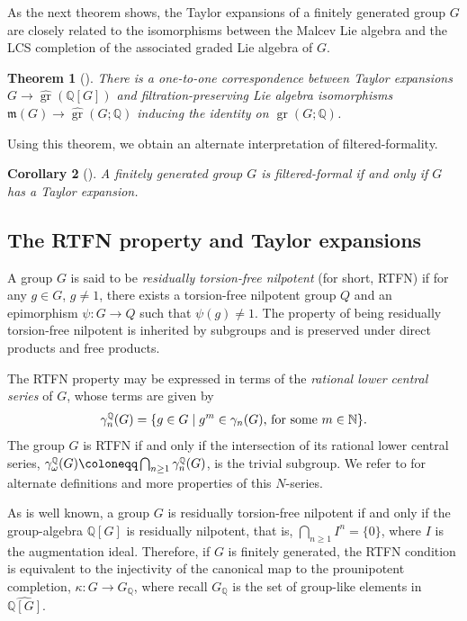 \documentclass{article}
\numberwithin{equation}{section}
\newtheorem{theorem}{Theorem}[section]
\newtheorem{corollary}[theorem]{Corollary}
\theoremstyle{definition}
\newcommand{\N}{\mathbb{N}}
\newcommand{\Q}{\mathbb{Q}}
\newcommand{\m}{{\mathfrak{m}}}
\DeclareMathOperator{\gr}{gr}
\DeclareMathOperator{\rat}{\scalebox{0.6}{$\Q$}}
\begin{document}
As the next theorem shows, the Taylor expansions of a finitely generated 
group $G$ are closely related to the isomorphisms between the Malcev Lie 
algebra and the LCS completion of the associated 
graded Lie algebra of $G$.

\begin{theorem}[\cite{SW-ejm}]
\label{thm:expansionFiltered}
There is a one-to-one correspondence between Taylor expansions 
$G\to \widehat{\gr}(\Q[G])$ and filtration-preserving Lie algebra isomorphisms 
$\m(G)\to \widehat{\gr}(G;\Q)$ inducing the identity on $\gr(G;\Q)$.  
\end{theorem}

Using this theorem, we obtain an alternate interpretation of filtered-formality.

\begin{corollary}[\cite{SW-ejm}]
\label{cor:TFF}
A finitely generated group $G$ is filtered-formal if and only if $G$ 
has a Taylor expansion.
\end{corollary}

\subsection{The RTFN property and Taylor expansions}
\label{subsec:rtfn-taylor}

A group $G$ is said to be {\em residually torsion-free nilpotent}\/ 
(for short, RTFN) if for any $g\in G$, $g\neq 1$,
there exists a torsion-free nilpotent group $Q$ 
and an epimorphism $\psi\colon G\to Q$ such that $\psi(g)\neq 1$. 
The property of being residually torsion-free nilpotent 
is inherited by subgroups and is preserved under 
direct products and free products.

The RTFN property may be expressed in terms of the {\em rational 
lower central series}\/ of $G$, whose terms are given by 
\begin{equation}
\label{eq:sqrt-filtration}
\gamma^{\rat}_{n}(G)=\{g\in G\mid \text{$g^m \in \gamma_{n}(G)$, 
for some $m\in \N$} \}.
\end{equation}
The group $G$ is RTFN if and only if the intersection of its rational 
lower central series, $\gamma^{\rat}_{\omega}(G)\coloneqq 
\bigcap_{n\ge 1} \gamma^{\rat}_{n}(G)$, is the trivial subgroup.
We refer to \cite{Su-lcs} for alternate definitions and more 
properties of this $N$-series.

As is well known, a group $G$ is residually 
torsion-free nilpotent if and only if the group-algebra 
$\Q[G]$ is residually nilpotent, that is, $\bigcap_{n\ge 1}I^n=\{0\}$, 
where $I$ is the augmentation ideal. 
Therefore, if $G$ is finitely generated, the RTFN condition is 
equivalent to the injectivity of the canonical map to the prounipotent 
completion, $\kappa\colon G\to G_{\Q}$, where recall $G_{\Q}$ is 
the set of group-like elements in $\widehat{\Q[G]}$.
\end{document}
